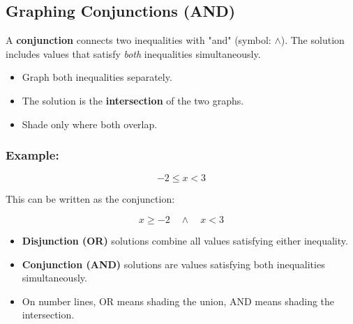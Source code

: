 \documentclass[11pt]{article}
\begin{document}
\vspace{1em}

\subsection{Graphing Conjunctions (AND)}

A \textbf{conjunction} connects two inequalities with "and" (symbol: \(\land\)).
The solution includes values that satisfy \emph{both} inequalities simultaneously.

\begin{itemize}
  \item Graph both inequalities separately.
  \item The solution is the \textbf{intersection} of the two graphs.
  \item Shade only where both overlap.
\end{itemize}

\subsubsection*{Example:}

\[
-2 \leq x < 3
\]

This can be written as the conjunction:

\[
x \geq -2 \quad \land \quad x < 3
\]

\begin{center}
\end{center}

\begin{tcolorbox}[colback=cyan!5!white, colframe=cyan!80!black, title=Summary]
\begin{itemize}
  \item \textbf{Disjunction (OR)} solutions combine all values satisfying either inequality.
  \item \textbf{Conjunction (AND)} solutions are values satisfying both inequalities simultaneously.
  \item On number lines, OR means shading the union, AND means shading the intersection.
\end{itemize}
\end{tcolorbox}
\end{document}
